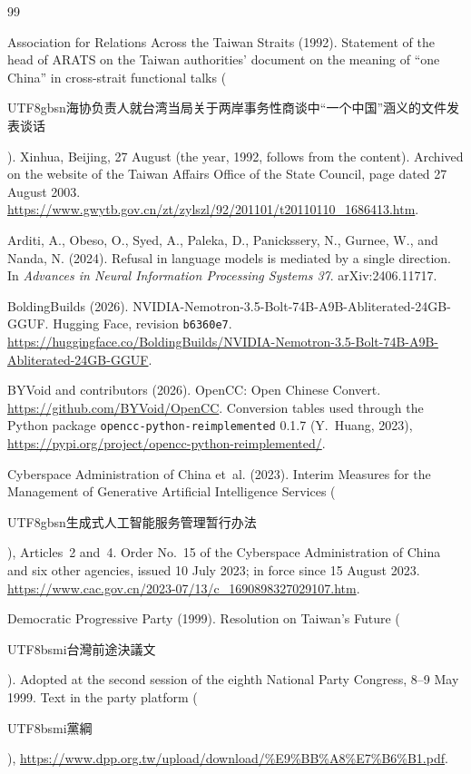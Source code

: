 \documentclass[11pt,a4paper]{article}
\newcommand{\zht}[1]{\begin{CJK}{UTF8}{bsmi}#1\end{CJK}}
\newcommand{\zhs}[1]{\begin{CJK}{UTF8}{gbsn}#1\end{CJK}}
\begin{document}
\begin{thebibliography}{99}

Association for Relations Across the Taiwan Straits (1992).
\newblock Statement of the head of ARATS on the Taiwan authorities' document on the meaning of ``one China'' in
cross-strait functional talks (\zhs{海协负责人就台湾当局关于两岸事务性商谈中“一个中国”涵义的文件发表谈话}).
\newblock Xinhua, Beijing, 27 August (the year, 1992, follows from the content). Archived on the website of the Taiwan
Affairs Office of the State Council, page dated 27 August 2003.
\url{https://www.gwytb.gov.cn/zt/zylszl/92/201101/t20110110_1686413.htm}.

Arditi, A., Obeso, O., Syed, A., Paleka, D., Panickssery, N., Gurnee, W., and Nanda, N. (2024).
\newblock Refusal in language models is mediated by a single direction.
\newblock In \emph{Advances in Neural Information Processing Systems 37}. arXiv:2406.11717.

BoldingBuilds (2026).
\newblock NVIDIA-Nemotron-3.5-Bolt-74B-A9B-Abliterated-24GB-GGUF.
\newblock Hugging Face, revision \texttt{b6360e7}.
\newblock \url{https://huggingface.co/BoldingBuilds/NVIDIA-Nemotron-3.5-Bolt-74B-A9B-Abliterated-24GB-GGUF}.

BYVoid and contributors (2026).
\newblock OpenCC: Open Chinese Convert.
\newblock \url{https://github.com/BYVoid/OpenCC}. Conversion tables used through the Python package
\texttt{opencc-python-reimplemented} 0.1.7 (Y.~Huang, 2023), \url{https://pypi.org/project/opencc-python-reimplemented/}.

Cyberspace Administration of China et~al. (2023).
\newblock Interim Measures for the Management of Generative Artificial Intelligence Services
(\zhs{生成式人工智能服务管理暂行办法}), Articles~2 and~4.
\newblock Order No.~15 of the Cyberspace Administration of China and six other agencies, issued 10 July 2023; in force
since 15 August 2023. \url{https://www.cac.gov.cn/2023-07/13/c_1690898327029107.htm}.

Democratic Progressive Party (1999).
\newblock Resolution on Taiwan's Future (\zht{台灣前途決議文}).
\newblock Adopted at the second session of the eighth National Party Congress, 8--9 May 1999. Text in the party
platform (\zht{黨綱}), \url{https://www.dpp.org.tw/upload/download/\%E9\%BB\%A8\%E7\%B6\%B1.pdf}.


\end{thebibliography}
\end{document}
